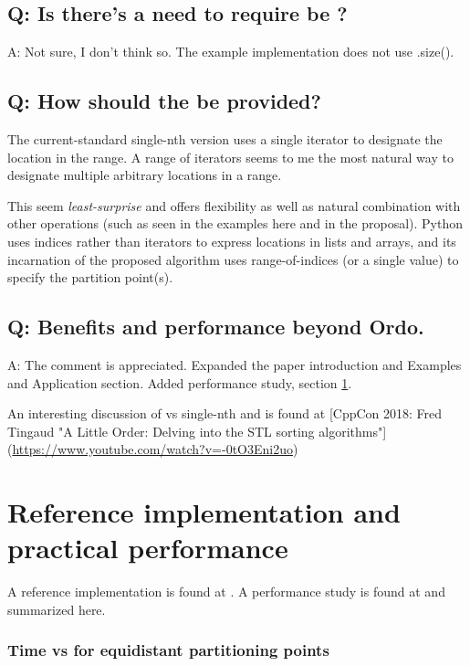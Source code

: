 \subsection{Q: Is there's a need to require  be ?}

A: Not sure, I don't think so. The example implementation does not use .size().


\subsection{Q: How should the  be provided?}

The current-standard single-nth version uses a single iterator  to designate the location in the range. A range of iterators seems to me the most natural way to designate multiple arbitrary locations in a range.

This seem \emph{least-surprise} and offers flexibility as well as natural combination with other operations (such as seen in the examples here and in the proposal). Python uses indices rather than iterators to express locations in lists and arrays, and its incarnation of the proposed algorithm uses range-of-indices (or a single value) to specify the partition point(s)\cite{NpPart}.

\subsection{Q: Benefits and performance beyond Ordo.}

A: The comment is appreciated. Expanded the paper introduction and Examples and Application section. Added performance study, section \ref{perfstudy}.

An interesting discussion of  vs single-nth  and  is found at [CppCon 2018: Fred Tingaud "A Little Order: Delving into the STL sorting algorithms"](\url{https://www.youtube.com/watch?v=-0tO3Eni2uo})


\newpage
\section{Reference implementation and practical performance}
\label{perfstudy}

A reference implementation is found at \cite{p2375src}. A performance study is found at \cite{p2375RefImpl} and summarized here. 
\subsubsection*{Time vs  for equidistant partitioning points}

